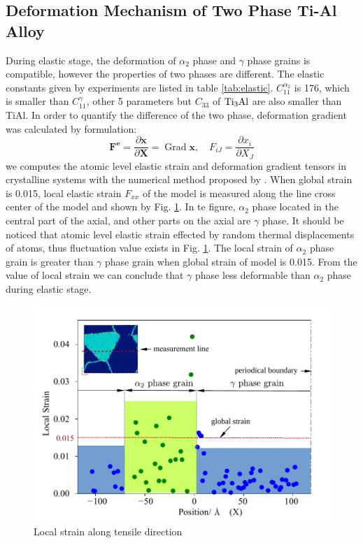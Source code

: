 \documentclass[materials,article,submit,moreauthors,pdftex,10pt,a4paper]{Definitions/mdpi}
\begin{document}
 

\subsection{Deformation Mechanism of Two Phase Ti-Al Alloy }


During elastic stage, the deformation of $\alpha_2$ phase and $\gamma$ phase grains is compatible, however the properties of two phases are different. The elastic constants given by  experiments\cite{Schwarz1995,Tanaka1996} are listed in  table \ref{tab:elastic}. $C_{11}^{\alpha_2}$ is 176, which is smaller than $C_{11}^{\gamma}$, other 5 parameters but $C_{33}$ of $\rm{Ti_3Al}$ are also smaller than TiAl. In order to quantify the difference of the two phase, deformation gradient was calculated by formulation:
\begin{equation}
\label{eq:strain-grade}
\mathbf { F^e } = \frac { \partial \mathbf { x } } { \partial \mathbf { X } } = \operatorname { Grad } \mathbf { x } , \quad F _ { i J } = \frac { \partial x _ { i } } { \partial X _ { J } }
\end{equation}
we computes the atomic level elastic strain and deformation gradient tensors in crystalline systems with the numerical method proposed by \cite{Singh2006}. When global strain is 0.015, local elastic strain $F_{xx}$ of the model is measured along the line cross center of the model and shown by Fig. \ref{fig:strain}. In te figure, $\alpha_2$ phase located in the central part of the axial, and other parts on the axial are $\gamma$ phase.  It should be noticed that atomic level elastic strain effected by random thermal displacements of atoms, thus fluctuation value exists in Fig. \ref{fig:strain}. The local strain of $\alpha_2$ phase grain is greater than $\gamma$ phase grain when global strain of model is 0.015. From the value of local strain we can conclude that $\gamma$ phase less deformable than $\alpha_2$ phase during elastic stage.
\begin{figure}[ht]
	\centering
	\includegraphics[width=0.75\linewidth]{img/strgrad}
	\caption{Local strain along tensile direction }
	\label{fig:strain}
\end{figure}
\end{document}

